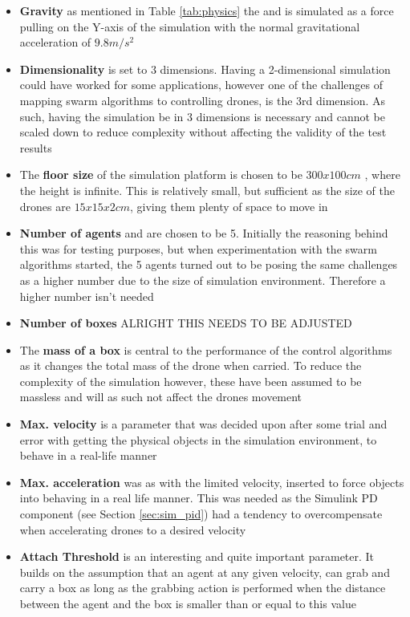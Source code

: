 \begin{itemize}
\item{\textbf{Gravity} as mentioned in Table \ref{tab:physics} the and is simulated as a force pulling on the Y-axis of the simulation with the normal gravitational acceleration of ${9.8m/s^2}$}	
\item{\textbf{Dimensionality} is set to 3 dimensions. Having a 2-dimensional simulation could have worked for some applications, however one of the challenges of mapping swarm algorithms to controlling drones, is the 3rd dimension. As such, having the simulation be in 3 dimensions is necessary and cannot be scaled down to reduce complexity without affecting the validity of the test results}	
\item{The \textbf{floor size} of the simulation platform is chosen to be ${300x100cm}$ , where the height is infinite. This is relatively small, but sufficient as the size of the drones are ${15x15x2cm}$, giving them plenty of space to move in}	
\item{\textbf{Number of agents} and are chosen to be 5. Initially the reasoning behind this was for testing purposes, but when experimentation with the swarm algorithms started, the 5 agents turned out to be posing the same challenges as a higher number due to the size of simulation environment. Therefore a higher number isn't needed}	
\item{\textbf{Number of boxes} ALRIGHT THIS NEEDS TO BE ADJUSTED} %
\item{The \textbf{mass of a box} is central to the performance of the control algorithms as it changes the total mass of the drone when carried. To reduce the complexity of the simulation however, these have been assumed to be massless and will as such not affect the drones movement}	
\item{\textbf{Max. velocity} is a parameter that was decided upon after some trial and error with getting the physical objects in the simulation environment, to behave in a real-life manner}	
\item{\textbf{Max. acceleration} was as with the limited velocity, inserted to force objects into behaving in a real life manner. This was needed as the Simulink PD component (see Section \ref{sec:sim_pid}) had a tendency to overcompensate when accelerating drones to a desired velocity}	
\item{\textbf{Attach Threshold} is an interesting and quite important parameter. It builds on the assumption that an agent at any given velocity, can grab and carry a box as long as the grabbing action is performed when the distance between the agent and the box is smaller than or equal to this value}	
\end{itemize}


